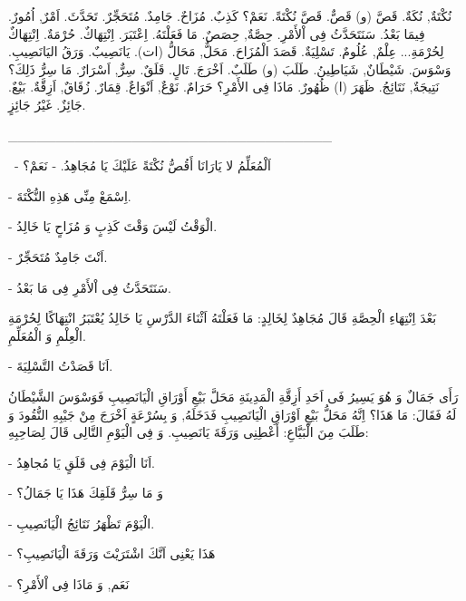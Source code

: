 \documentclass[a5paper]{article}
\begin{document}
نُكْتَةٌ, نُكَةٌ. قَصَّ (و) قَصٌّ. قَصَّ نُكْتَةً. نَعَمْ؟ كَذِبٌ. مُزَاحٌ. جَامِدٌ. مُتَحَجِّرٌ. تَحَدَّثَ. اَمْرٌ, اُمُورٌ. فِيمَا بَعْدُ. سَنَتَحَدَّثُ فِى اْلأَمْرِ. حِصَّةٌ, حِصَصٌ. مَا فَعَلْتَهُ. اِعْتَبَرَ. اِنْتِهَاكٌ. حُرْمَةٌ. اِنْتِهَاكٌ لِحُرْمَةِ... عِلْمٌ, عُلُومٌ. تَسْلِيَةٌ. \newline
قَصَدَ الْمُزَاحَ. مَحَلٌّ, مَحَالُّ (ات). يَانَصِيبٌ. \newline
وَرَقُ اليَانَصِيبِ. وَسْوَسَ. شَيْطَانٌ, شَيَاطِينُ. \newline
طَلَبَ (و) طَلَبٌ. اَخْرَجَ. تَالٍ. قَلَقٌ. سِرٌّ, اَسْرَارٌ. \newline
مَا سِرُّ ذَلِكَ؟ نَتِيجَةٌ, نَتَائِجُ. ظَهَرَ (ا) ظُهُورٌ. \newline
مَاذَا فِى الأَمْرِ؟ حَرَامٌ. نَوْعٌ, اَنْوَاعٌ. قِمَارٌ. زُقَاقٌ, اَزِقَّةٌ. بَيْعٌ. جَائِزٌ. غَيْرُ جَائِزٍ.

\_\_\_\_\_\_\_\_\_\_\_\_\_\_\_\_\_\_\_\_\_\_\_\_\_\_\_\_\_\_\_\_\_\_

\ - اَلْمُعَلِّمُ لا يَارَانَا أَقُصُّ نُكْتَةً عَلَيْكَ يَا مُجَاهِدُ. - نَعَمْ؟

- اِسْمَعْ مِنِّى هَذِهِ النُّكْتَةَ.

- الْوَقْتُ لَيْسَ وَقْتَ كَذِبٍ وَ مُزَاحٍ يَا خَالِدُ.

- اَنْتَ جَامِدٌ مُتَحَجِّرٌ.

- سَنَتَحَدَّثُ فِى اْلأَمْرِ فِى مَا بَعْدُ.

بَعْدَ اِنْتِهَاءِ الْحِصَّةِ قَالَ مُجَاهِدٌ لِخَالِدٍ: مَا فَعَلْتَهُ اَثْنَاءَ الدَّرْسِ يَا خَالِدُ يُعْتَبَرُ انْتِهَاكًا لِحُرْمَةِ الْعِلْمِ وَ الْمُعَلِّمِ.

- اَنَا قَصَدْتُ التَّسْلِيَةَ.ِ

رَأَى جَمَالٌ وَ هُوَ يَسِيرُ فَى اَحَدِ أَزِقَّةِ الْمَدِينَةِ مَحَلَّ بَيْعِ أَوْرَاقِ الْيَانَصِيبِ فَوَسْوَسَ الشَّيْطَانُ لَهُ فَقَالَ: مَا هَذَا؟ اِنَّهُ مَحَلُّ بَيْعِ اَوْرَاقِ الْيَانَصِيبِ فَدَخَلَهُ, وَ بِسُرْعَةٍ اَخْرَجَ مِنْ جَيْبِهِ النُّقُودَ وَ طَلَبَ مِنَ الْبَيَّاعِ: أَعْطِنِى وَرَقَةَ يَانَصِيبِ. وَ فِى الْيَوْمِ التَّالِى قَالَ لِصَاحِبِهِ:

- اَنَا الْيَوْمَ فِى قَلَقٍ يَا مُجاهِدُ.ِ

- وَ مَا سِرُّ قَلَقِكَ هَذَا يَا جَمَالُ؟

- الْيَوْمَ تَظْهَرُ نَتَائِجُ الْيَانَصِيبِ.ِ

- هَذَا يَعْنِى اَنَّكَ اشْتَرَيْتَ وَرَقَةَ الْيَانَصِيبِ؟

- نَعَم, وَ مَاذَا فِى اْلأَمْرِ؟
\end{document}
